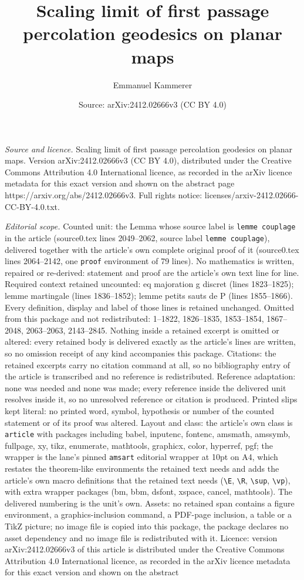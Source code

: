 \documentclass[10pt,a4paper]{amsart}
\title[Scaling limit of first passage percolation geodesics on plan]{Scaling limit of first passage percolation geodesics on planar maps}
\author{Emmanuel Kammerer}
\date{Source: arXiv:2412.02666v3 (CC BY 4.0)}
\begin{document}
\maketitle

\noindent\emph{Source and licence.} Scaling limit of first passage percolation geodesics on planar maps. Version arXiv:2412.02666v3 (CC BY 4.0), distributed under the Creative Commons Attribution 4.0 International licence, as recorded in the arXiv licence metadata for this exact version and shown on the abstract page https://arxiv.org/abs/2412.02666v3. Full rights notice: licenses/arxiv-2412.02666-CC-BY-4.0.txt.\par\smallskip

\noindent\textit{Editorial scope.} Counted unit: the Lemma whose source label is \texttt{lemme couplage} in the article (source0.tex lines 2049--2062, source label \texttt{lemme couplage}), delivered together with the article's own complete original proof of it (source0.tex lines 2064--2142, one \texttt{proof} environment of 79 lines). No mathematics is written, repaired or re-derived: statement and proof are the article's own text line for line. Required context retained uncounted: eq majoration g discret (lines 1823--1825); lemme martingale (lines 1836--1852); lemme petits sauts de P (lines 1855--1866). Every definition, display and label of those lines is retained unchanged. Omitted from this package and not redistributed: 1--1822, 1826--1835, 1853--1854, 1867--2048, 2063--2063, 2143--2845. Nothing inside a retained excerpt is omitted or altered: every retained body is delivered exactly as the article's lines are written, so no omission receipt of any kind accompanies this package. Citations: the retained excerpts carry no citation command at all, so no bibliography entry of the article is transcribed and no reference is redistributed. Reference adaptation: none was needed and none was made; every reference inside the delivered unit resolves inside it, so no unresolved reference or citation is produced. Printed slips kept literal: no printed word, symbol, hypothesis or number of the counted statement or of its proof was altered. Layout and class: the article's own class is \texttt{article} with packages including babel, inputenc, fontenc, amsmath, amssymb, fullpage, xy, tikz, enumerate, mathtools, graphicx, color, hyperref, pgf; the wrapper is the lane's pinned \texttt{amsart} editorial wrapper at 10pt on A4, which restates the theorem-like environments the retained text needs and adds the article's own macro definitions that the retained text needs (\texttt{\textbackslash E}, \texttt{\textbackslash R}, \texttt{\textbackslash sup}, \texttt{\textbackslash vp}), with extra wrapper packages (bm, bbm, dsfont, xspace, cancel, mathtools). The delivered numbering is the unit's own. Assets: no retained span contains a figure environment, a graphics-inclusion command, a PDF-page inclusion, a table or a TikZ picture; no image file is copied into this package, the package declares no asset dependency and no image file is redistributed with it. Licence: version arXiv:2412.02666v3 of this article is distributed under the Creative Commons Attribution 4.0 International licence, as recorded in the arXiv licence metadata for this exact version and shown on the abstract 
\end{document}
